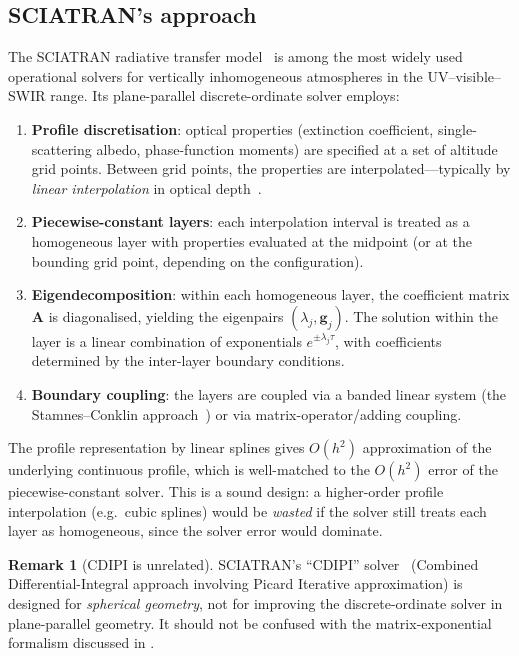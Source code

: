 \documentclass[11pt,a4paper]{article}
\newcommand{\vect}[1]{\bm{#1}}
\newcommand{\mat}[1]{\mathbf{#1}}
\theoremstyle{definition}
\newtheorem{remark}{Remark}
\begin{document}
\subsection{SCIATRAN's approach}\label{sec:sciatran}

The SCIATRAN radiative transfer model~\cite{rozanov2014} is among the
most widely used operational solvers for vertically inhomogeneous
atmospheres in the UV--visible--SWIR range.  Its plane-parallel
discrete-ordinate solver employs:
\begin{enumerate}[nosep]
\item \textbf{Profile discretisation}: optical properties (extinction
  coefficient, single-scattering albedo, phase-function moments) are
  specified at a set of altitude grid points.  Between grid points, the
  properties are interpolated---typically by \emph{linear
  interpolation} in optical depth~\cite{rozanov2014,rozanov2005}.
\item \textbf{Piecewise-constant layers}: each interpolation interval is
  treated as a homogeneous layer with properties evaluated at the
  midpoint (or at the bounding grid point, depending on the
  configuration).
\item \textbf{Eigendecomposition}: within each homogeneous layer, the
  coefficient matrix $\mat{A}$ is diagonalised, yielding the eigenpairs
  $(\lambda_j, \vect{g}_j)$.  The solution within the layer is a linear
  combination of exponentials $e^{\pm\lambda_j\tau}$, with coefficients
  determined by the inter-layer boundary conditions.
\item \textbf{Boundary coupling}: the layers are coupled via a
  banded linear system (the Stamnes--Conklin
  approach~\cite{stamnes1984}) or via matrix-operator/adding
  coupling.
\end{enumerate}

The profile representation by linear splines gives $O(h^2)$
approximation of the underlying continuous profile, which is
well-matched to the $O(h^2)$ error of the piecewise-constant solver.
This is a sound design: a higher-order profile interpolation (e.g.\
cubic splines) would be \emph{wasted} if the solver still treats each
layer as homogeneous, since the solver error would dominate.

\begin{remark}[CDIPI is unrelated]
SCIATRAN's ``CDIPI'' solver~\cite{rozanov2005} (Combined
Differential-Integral approach involving Picard Iterative approximation)
is designed for \emph{spherical geometry}, not for improving the
discrete-ordinate solver in plane-parallel geometry.  It should not be
confused with the matrix-exponential formalism discussed in
.
\end{remark}
\end{document}

